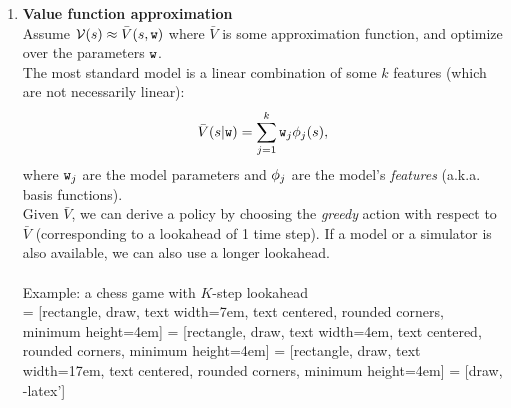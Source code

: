 \begin{enumerate}
\item \textbf{Value function approximation}\\
Assume $\mathcal{V}(s)\approx \bar{V}(s,\texttt{w})$ where $\bar{V}$ is some approximation function, and optimize over the parameters $\texttt{w}$.\\
The most standard model is a linear combination of some $k$ features (which are not necessarily linear):
$$\bar{V}(s|\texttt{w}) = \sum_{j=1}^k \texttt{w}_j \phi_j(s),$$
where $\texttt{w}_j$ are the model parameters and $\phi_j$ are the model's \emph{features} (a.k.a. basis functions).\\
Given $\bar{V}$, we can derive a policy by choosing the \emph{greedy} action with respect to $\bar{V}$ (corresponding to a lookahead of 1 time step). If a model or a simulator is also available, we can also use a longer lookahead.\\
\\
Example: a chess game with $K$-step lookahead\\
 = [rectangle, draw,
    text width=7em, text centered, rounded corners, minimum height=4em]
 = [rectangle, draw,
    text width=4em, text centered, rounded corners, minimum height=4em]
 = [rectangle, draw,
    text width=17em, text centered, rounded corners, minimum height=4em]
 = [draw, -latex']


\end{enumerate}
